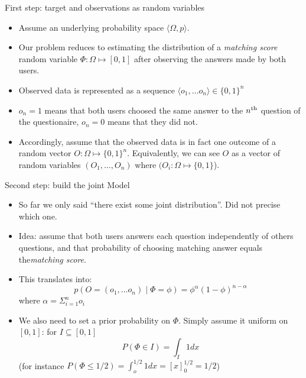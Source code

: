 \documentclass{beamer}
\begin{document}
\begin{frame}{First step: target and observations as random variables}
  \begin{itemize}
  \item Assume an underlying probability space $\langle \Omega, p \rangle$.
  \item Our problem reduces to estimating the distribution of a \emph{matching score} random variable $\Phi: \Omega \mapsto [0, 1]$ after observing the answers made by both users.
  \item Observed data is represented as a sequence $\langle o_1, \dots o_n \rangle \in \{0,1\}^n$
  \item $o_n = 1$ means that both users choosed the same answer to the $n^\textnormal{th}$ question of the questionaire, $o_n = 0$ means that they did not.
  \item Accordingly, assume that the observed data is in fact one outcome of a random vector $O: \Omega \mapsto \{0, 1\}^n$. Equivalently, we can see $O$ as a vector of random variables $(O_1, \dots, O_n)$ where  $(O_i: \Omega \mapsto \{0,1\}$).
  \end{itemize}
    
\end{frame}

\begin{frame}{Second step: build the joint Model}
  \begin{itemize}
  \item So far we only said ``there exist some joint distribution''. Did not precise which one.
  \item Idea: assume that both users answers each question independently of others questions, and that probability of choosing matching answer equals the\emph{matching score}.
  \item This translates into: \[ p(O = (o_1, \dots o_n) \mid \Phi = \phi) = \phi^\alpha (1-\phi)^{n-\alpha} \] where $\alpha = \Sigma_{i=1}^n o_i$
  \item We also need to set a prior probability on $\Phi$. Simply assume it uniform on $[0,1]$: for $I \subseteq [0,1]$ \[P(\Phi \in I) = \int_I 1 dx\]
    (for instance $P(\Phi \le 1/2) = \int_o^{1/2} 1 dx =  [x]^{1/2}_{0} = 1/2$)
  \end{itemize}
\end{frame}
\end{document}
